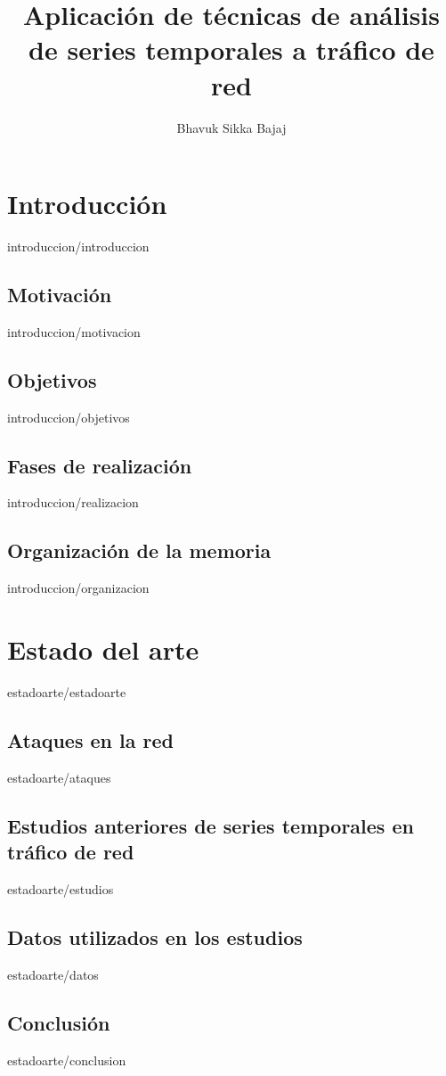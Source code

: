 \documentclass[epsbased,copyright,final,printable,covers,extendedindex,firstnumbered,tfg,gnuplot]{tfgtfmthesisuam}
\title{Aplicaci\'on de t\'ecnicas de an\'alisis de series temporales a tr\'afico de red}
\author{Bhavuk Sikka Bajaj}
\begin{document}


\chapter{Introducci\'on\label{CAP:INTRODUCCION}}{introduccion/introduccion}
  \section{Motivaci\'on\label{SEC:MOTIVACION}}{introduccion/motivacion}
  \section{Objetivos\label{SEC:OBJETIVOS}}{introduccion/objetivos}
  \section{Fases de realizaci\'on\label{SEC:REALIZACION}}{introduccion/realizacion}
  \section{Organizaci\'on de la memoria\label{SEC:ORGANIZACION}}{introduccion/organizacion}

\chapter{Estado del arte\label{CAP:ESTADOARTE}}{estadoarte/estadoarte}
  \section{Ataques en la red\label{SEC:ATAQUES}}{estadoarte/ataques}
  \section{Estudios anteriores de series temporales en tr\'afico de red\label{SEC:ESTUDIOS}}{estadoarte/estudios} %
  \section{Datos utilizados en los estudios\label{SEC:DATOS}}{estadoarte/datos}
  \section{Conclusi\'on\label{SEC:EACONCLUSION}}{estadoarte/conclusion}
\end{document}
